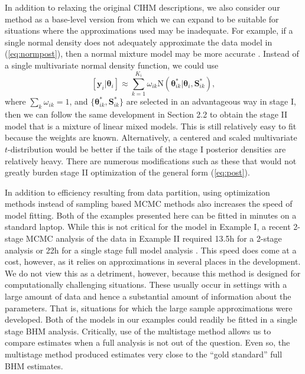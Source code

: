 \documentclass[12pt]{article}
\newcommand{\by}{\mathbf{y}}
\newcommand{\bt}{\boldsymbol{\theta}}
\newcommand{\bS}{\mathbf{S}}
\begin{document}
In addition to relaxing the original CIHM descriptions, we also consider our method as a base-level version from which we can expand to be suitable for situations where the approximations used may be inadequate. For example, if a single normal density does not adequately approximate the data model in (\ref{eq:normpost}), then a normal mixture model may be more accurate \citep{gelman2013bayesian}. Instead of a single multivariate normal density function, we could use     
\[
[\by_i|\bt_i] \approx \sum_{k=1}^{K_i}\omega_{ik}\text{N}(\bt_{ik}^*|\bt_{i}, \bS_{ik}^*),
\]
where $\sum_k \omega_{ik} = 1$, and $\{\bt_{ik}^*, \bS_{ik}^*\}$ are selected in an advantageous way in stage I, then we can follow the same development in Section 2.2 to obtain the stage II model that is a mixture of linear mixed models. This is still relatively easy to fit because the weights are known. Alternatively, a centered and scaled multivariate $t$-distribution would be better if the tails of the stage I posterior densities are relatively heavy. There are numerous modifications such as these that would not greatly burden stage II optimization of the general form (\ref{eq:post}).

In addition to efficiency resulting from data partition, using optimization methods instead of sampling based MCMC methods also increases the speed of model fitting. Both of the examples presented here can be fitted in minutes on a standard laptop. While this is not critical for the model in Example I, a recent 2-stage MCMC analysis of the data in Example II required 13.5h for a 2-stage analysis or 22h for a single stage full model analysis \citep{goudie2019joining}. This speed does come at a cost, however, as it relies on approximations in several places in the development. We do not view this as a detriment, however, because this method is designed for computationally challenging situations. These usually occur in settings with a large amount of data and hence a substantial amount of information about the parameters. That is, situations for which the large sample approximations were developed. Both of the models in our examples could readily be fitted in a single stage BHM analysis. Critically, use of the multistage method allows us to compare estimates when a full analysis is not out of the question. Even so, the multistage method produced estimates very close to the ``gold standard'' full BHM estimates.
\end{document}
